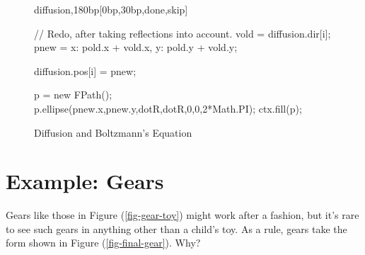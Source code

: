 \documentclass[10pt]{article}
\begin{document}
\begin{figure}
\begin{figput}{diffusion,180bp}[0bp,30bp,done,skip]
{{        // Redo, after taking reflections into account.
        vold = diffusion.dir[i];
        pnew = {x: pold.x + vold.x, y: pold.y + vold.y};

        diffusion.pos[i] = pnew;

        p = new FPath();
        p.ellipse(pnew.x,pnew.y,dotR,dotR,0,0,2*Math.PI);
        ctx.fill(p);
      }
}    
\end{figput}
\caption{Diffusion and Boltzmann's Equation}
\label{fig-boltzmann}
\end{figure}

\newpage

\section{Example: Gears}

Gears like those in Figure (\ref{fig-gear-toy}) might work after a
fashion, but it's rare to see such gears in anything other than a
child's toy. As a rule, gears take the form shown in Figure 
(\ref{fig-final-gear}). Why? 
\end{document}
